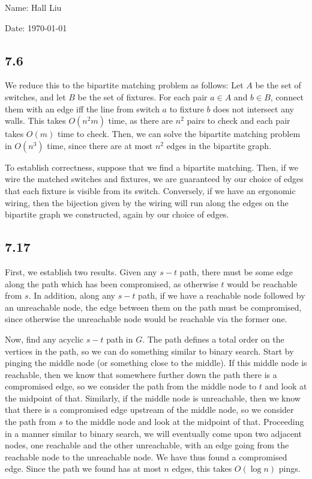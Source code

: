 \documentclass{article}
\begin{document}
Name: Hall Liu

Date: \today 

\subsection*{7.6}
We reduce this to the bipartite matching problem as follows: Let $A$ be the set of switches, and let $B$ be the set of fixtures. For each pair $a\in A$ and $b\in B$, connect them with an edge iff the line from switch $a$ to fixture $b$ does not intersect any walls. This takes $O(n^2m)$ time, as there are $n^2$ pairs to check and each pair takes $O(m)$ time to check. Then, we can solve the bipartite matching problem in $O(n^3)$ time, since there are at most $n^2$ edges in the bipartite graph.

To establish correctness, suppose that we find a bipartite matching. Then, if we wire the matched switches and fixtures, we are guaranteed by our choice of edges that each fixture is visible from its switch. Conversely, if we have an ergonomic wiring, then the bijection given by the wiring will run along the edges on the bipartite graph we constructed, again by our choice of edges.
\subsection*{7.17}
First, we establish two results. Given any $s-t$ path, there must be some edge along the path which has been compromised, as otherwise $t$ would be reachable from $s$. In addition, along any $s-t$ path, if we have a reachable node followed by an unreachable node, the edge between them on the path must be compromised, since otherwise the unreachable node would be reachable via the former one. 

Now, find any acyclic $s-t$ path in $G$. The path defines a total order on the vertices in the path, so we can do something similar to binary search. Start by pinging the middle node (or something close to the middle). If this middle node is reachable, then we know that somewhere further down the path there is a compromised edge, so we consider the path from the middle node to $t$ and look at the midpoint of that. Similarly, if the middle node is unreachable, then we know that there is a compromised edge upstream of the middle node, so we consider the path from $s$ to the middle node and look at the midpoint of that. Proceeding in a manner similar to binary search, we will eventually come upon two adjacent nodes, one reachable and the other unreachable, with an edge going from the reachable node to the unreachable node. We have thus found a compromised edge. Since the path we found has at most $n$ edges, this takes $O(\log n)$ pings. 
\end{document}
